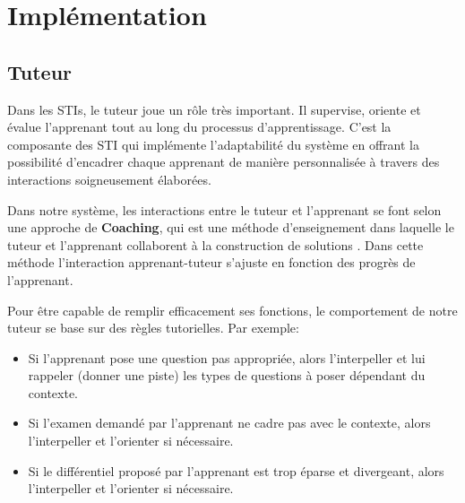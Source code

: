 
\chapter{Implémentation}
\label{chp:impl}




\section{Tuteur}
Dans les STIs, le tuteur joue un rôle très important. Il supervise, oriente et évalue l'apprenant tout au long du processus d'apprentissage. C'est la composante des STI qui implémente l'adaptabilité du système en
offrant la possibilité d'encadrer chaque apprenant de manière personnalisée à travers des interactions soigneusement élaborées.

Dans notre système, les interactions entre le tuteur et l'apprenant se font selon une approche de \textbf{Coaching}, qui est une méthode d'enseignement dans laquelle le tuteur et l'apprenant collaborent à la construction de solutions \cite{vanlehn1996conceptual}. Dans cette méthode l'interaction apprenant-tuteur s'ajuste en fonction des progrès de l'apprenant. 

Pour être capable de remplir efficacement ses fonctions, le comportement de notre tuteur se base sur des règles tutorielles. Par exemple:
\begin{itemize}
    \item Si l'apprenant pose une question pas appropriée, alors l'interpeller et lui rappeler (donner une piste) les types de questions à poser dépendant du contexte.
    \item Si l'examen demandé par l'apprenant ne cadre pas avec le contexte, alors l'interpeller et l'orienter si nécessaire.
    \item Si le différentiel proposé par l'apprenant est trop éparse et divergeant, alors l'interpeller et l'orienter si nécessaire.
\end{itemize}


